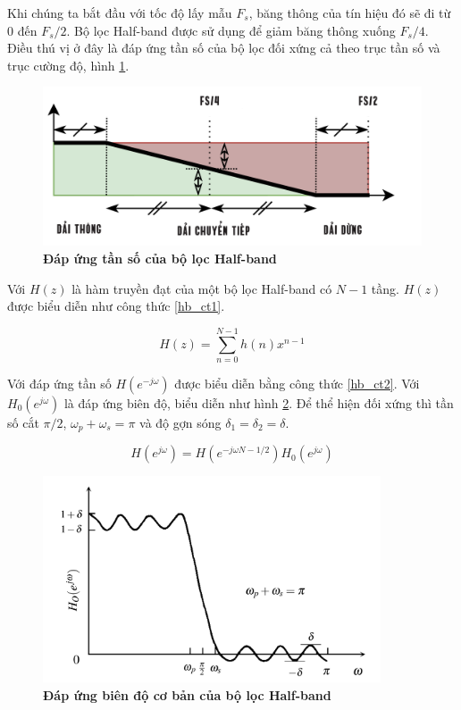  Khi chúng ta bắt đầu với tốc độ lấy mẫu $F_s$, băng thông của tín hiệu đó sẽ đi từ $0$ đến $F_s/2$. Bộ lọc Half-band được sử dụng để giảm băng thông xuống $F_s/4$. Điều thú vị ở đây là đáp ứng tần số của bộ lọc đối xứng cả theo trục tần số và trục cường độ, hình \ref{half_band_symmetry}.
\begin{figure}[ht!]
    \centering
    \includegraphics[width=12cm]{Images/Chuong2/halfband-half_band_symmetry.png}
    \caption[Đáp ứng tần số của bộ lọc Half-band]{\bfseries \fontsize{12pt}{0pt}\selectfont Đáp ứng tần số của bộ lọc Half-band}
    \label{half_band_symmetry}
\end{figure}

Với $H(z)$ là hàm truyền đạt của một bộ lọc Half-band có $N-1$ tầng. $H(z)$ được biểu diễn như công thức \ref{hb_ct1}.

\begin{equation}\label{hb_ct1}
    H(z) = \sum^{N-1}_{n = 0}h(n)x^{n-1}
\end{equation}

Với đáp ứng tần số $H(e^{-j\omega})$ được biểu diễn bằng công thức \ref{hb_ct2}. Với $H_0(e^{j\omega})$ là đáp ứng biên độ, biểu diễn như hình \ref{hb_1}. Để thể hiện đối xứng thì tần số cắt $\pi/2$, $\omega_p + \omega_s = \pi$ và độ gợn sóng $\delta_1=\delta_2=\delta$.

\begin{equation}\label{hb_ct2}
    H(e^{j\omega}) = H(e^{-j\omega N - 1/2})H_0(e^{j\omega}) 
\end{equation}

\begin{figure}[ht!]
    \centering
    \includegraphics[width=10cm]{Images/Chuong2/half-band.png}
    \caption[Đáp ứng biên độ cơ bản của bộ lọc Half-band]{\bfseries \fontsize{12pt}{0pt}\selectfont Đáp ứng biên độ cơ bản của bộ lọc Half-band}
    \label{hb_1}
\end{figure}

